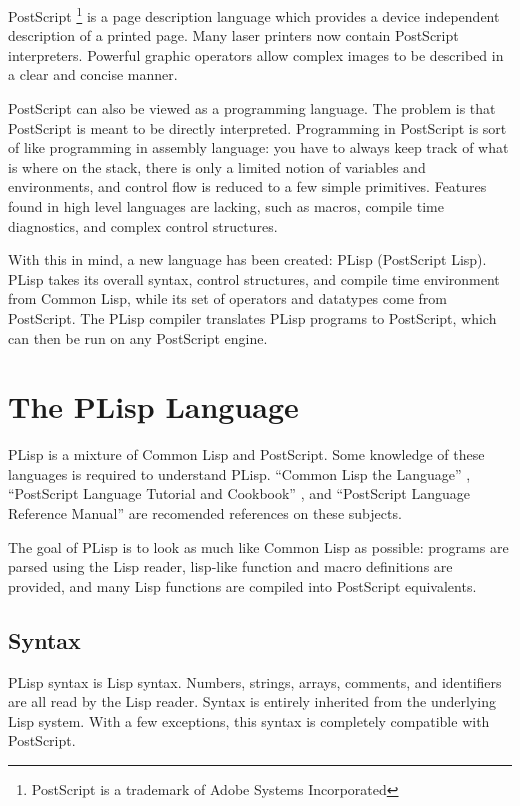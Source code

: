 PostScript \footnote{PostScript is a trademark of Adobe Systems
Incorporated} is a page description language which provides a device
independent 
description of a printed page.  Many laser printers now contain PostScript
interpreters.  Powerful graphic operators allow
complex images to be described in a clear and concise manner.

PostScript can also be viewed as a  programming language.
The problem is that PostScript is meant to be directly interpreted.
Programming in PostScript is sort of like programming in assembly
language: you have to always keep track of what is where on the stack,
there is only a limited notion of variables and environments, and
control flow is reduced to a few simple primitives.  Features found in
high level languages are lacking, such as macros, compile time diagnostics,
and complex control structures.

With this in mind, a new language has been created: PLisp (PostScript
Lisp).  PLisp takes its overall syntax, control structures, and
compile time environment from Common Lisp, while its set of operators
and datatypes come from PostScript.  The PLisp compiler translates
PLisp programs to PostScript, which can then be run on any
PostScript engine.

\section{The PLisp Language}

PLisp is a mixture of Common Lisp and PostScript.  Some knowledge of
these languages is required to understand PLisp.  ``Common Lisp the Language''
\cite{cltl}, ``PostScript Language Tutorial and Cookbook''
\cite{cook}, and ``PostScript Language Reference Manual'' \cite{postref}
are recomended references on these subjects.

The goal of PLisp is to look as much like Common Lisp as possible:
programs are parsed using the Lisp reader, lisp-like function and
macro definitions are provided, and many Lisp functions are compiled into
PostScript equivalents.

\subsection{Syntax}
PLisp syntax is Lisp syntax.  Numbers, strings, arrays, comments, and
identifiers 
are all read by the Lisp reader.  Syntax is entirely
inherited from the underlying Lisp system.  With a few
exceptions, this syntax is completely compatible with PostScript.

